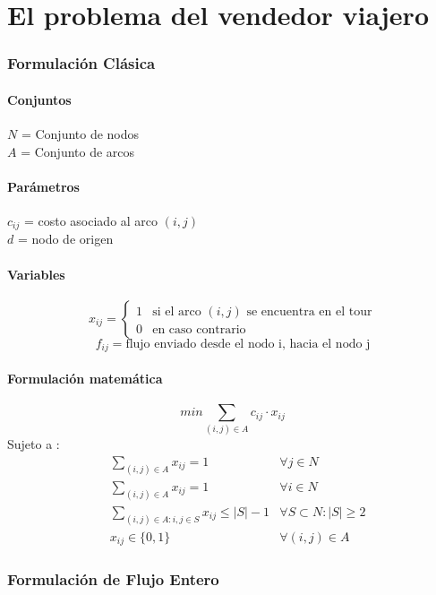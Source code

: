 \documentclass{article}
\numberwithin{equation}{section}
\begin{document}
\newpage
\part{El problema del vendedor viajero}
\section{Formulación Clásica}
\subsection{Conjuntos}
$N$ = Conjunto de nodos\\
$A$ = Conjunto de arcos
\subsection{Parámetros}
$c_{ij}$ = costo asociado al arco $(i,j)$\\
$d$ = nodo de origen
\subsection{Variables}
\begin{flushleft}
\[x_{ij}={\begin{cases}1&{\mbox{si el arco $(i,j)$ se encuentra en el tour}}\\0&{\mbox{en caso contrario}}\end{cases}}
\]
\[f_{ij} = \mbox{flujo enviado desde el nodo i, hacia el nodo j}\]
\end{flushleft}
\subsection{Formulación matemática}
\begin{equation}
min \sum_{(i,j) \in A} c_{ij} \cdot x_{ij}
\end{equation}
Sujeto a : \begin{align}
& \sum_{(i,j) \in A} x_{ij} = 1 &\forall j \in N \\
& \sum_{(i,j) \in A} x_{ij} = 1 &\forall i \in N \\
& \sum_{(i,j) \in A: i,j \in S} x_{ij} \leq |S| - 1 &\forall S \subset N : |S| \geq 2 \\
& x_{ij} \in \{0,1\} &\forall (i,j) \in A
\end{align}


\newpage
\section{Formulación de Flujo Entero}
\end{document}
